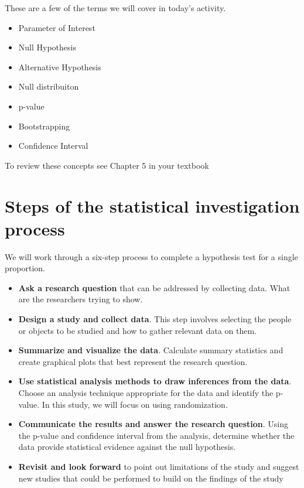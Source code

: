 \documentclass[
]{report}
\begin{document}
These are a few of the terms we will cover in today's activity.

\begin{itemize}
\item
  Parameter of Interest
\item
  Null Hypothesis
\item
  Alternative Hypothesis
\item
  Null distribuiton
\item
  p-value
\item
  Bootstrapping
\item
  Confidence Interval
\end{itemize}

To review these concepts see Chapter 5 in your textbook

\hypertarget{steps-of-the-statistical-investigation-process}{%
\section{Steps of the statistical investigation process}\label{steps-of-the-statistical-investigation-process}}

We will work through a six-step process to complete a hypothesis test for a single proportion.

\begin{itemize}
\item
  \textbf{Ask a research question} that can be addressed by collecting data. What are the researchers trying to show.
\item
  \textbf{Design a study and collect data}. This step involves selecting the people or objects to be studied and how to gather relevant data on them.
\item
  \textbf{Summarize and visualize the data}. Calculate summary statistics and create graphical plots that best represent the research question.
\item
  \textbf{Use statistical analysis methods to draw inferences from the data}. Choose an analysis technique appropriate for the data and identify the p-value. In this study, we will focus on using randomization.
\item
  \textbf{Communicate the results and answer the research question}. Using the p-value and confidence interval from the analysis, determine whether the data provide statistical evidence against the null hypothesis.
\item
  \textbf{Revisit and look forward} to point out limitations of the study and suggest new studies that could be performed to build on the findings of the study
\end{itemize}
\end{document}
